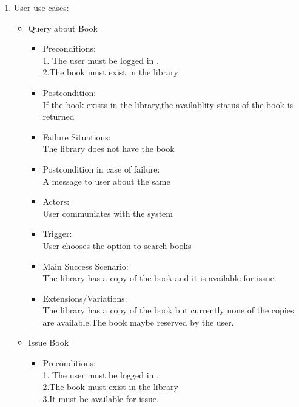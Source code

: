 \documentclass[a4paper]{article}
\begin{document}
\begin{enumerate}
\item User use cases:
	\begin{itemize}
	
	\item Query about Book\\
	\begin{itemize}
	\item Preconditions:\\
	1. The user must be logged in .\\
	2.The book must exist in the library\\
\item  Postcondition: \\If the book exists in the library,the availablity status of the book is returned\\
 \item Failure Situations:\\ The library does not have  the book \\
 \item Postcondition in case of failure:\\A message to user about the same\\
\item  Actors:\\ User communiates with the system\\
\item  Trigger:\\ User chooses the option to search books\\
 \item Main Success Scenario: \\The library has a copy of the book and it is available for issue.\\
\item  Extensions/Variations: \\The library has a copy of the book but currently none of the copies are available.The book maybe reserved by the user.
	\end{itemize}
 \item Issue Book\\
	\begin{itemize}
	 \item Preconditions:\\
	 1. The user must be logged in .\\
	 2.The book must exist in the library \\
	 3.It must be available for issue.\\

\end{itemize}
\end{itemize}
\end{enumerate}
\end{document}
